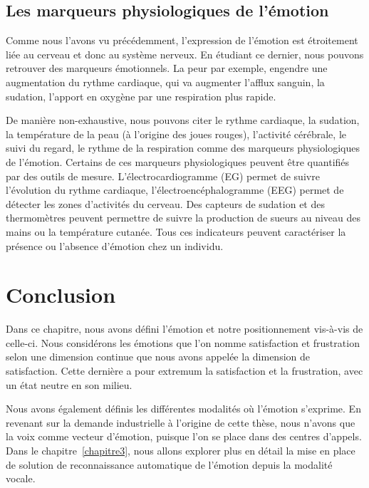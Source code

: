 \subsection{Les marqueurs physiologiques de l'émotion}
Comme nous l'avons vu précédemment, l'expression de l'émotion est étroitement liée au cerveau et donc au système nerveux. En étudiant ce dernier, nous pouvons retrouver des marqueurs émotionnels. La peur par exemple, engendre une augmentation du rythme cardiaque, qui va augmenter l'afflux sanguin, la sudation, l'apport en oxygène par une respiration plus rapide.

De manière non-exhaustive, nous pouvons citer le rythme cardiaque, la sudation, la température de la peau (à l'origine des joues rouges), l'activité cérébrale, le suivi du regard, le rythme de la respiration comme des marqueurs physiologiques de l'émotion. Certains de ces marqueurs physiologiques peuvent être quantifiés par des outils de mesure. L'électrocardiogramme (EG) permet de suivre l'évolution du rythme cardiaque, l'électroencéphalogramme (EEG) permet de détecter les zones d'activités du cerveau. Des capteurs de sudation et des thermomètres peuvent permettre de suivre la production de sueurs au niveau des mains ou la température cutanée. Tous ces indicateurs peuvent caractériser la présence ou l'absence d'émotion chez un individu.

\section{Conclusion}
Dans ce chapitre, nous avons défini l'émotion et notre positionnement vis-à-vis de celle-ci. Nous considérons les émotions que l'on nomme satisfaction et frustration selon une dimension continue que nous avons appelée la dimension de satisfaction. Cette dernière a pour extremum la satisfaction et la frustration, avec un état neutre en son milieu.

Nous avons également définis les différentes modalités où l'émotion s'exprime. En revenant sur la demande industrielle à l'origine de cette thèse, nous n'avons que la voix comme vecteur d'émotion, puisque l'on se place dans des centres d'appels. Dans le chapitre~\ref{chapitre3}, nous allons explorer plus en détail la mise en place de solution de reconnaissance automatique de l'émotion depuis la modalité vocale.
